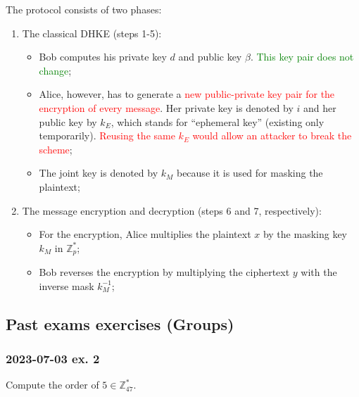 \documentclass[11pt, a4paper]{article}
\newcommand{\doublequotes}[1]{“#1”}
\begin{document}
\hfill\break The protocol consists of two phases:
\begin{enumerate}
    \item The classical DHKE (steps 1-5):
    \begin{itemize}
        \item Bob computes his private key $d$ and public key $\beta$. \textcolor{Green}{This key pair does not change};
        \item Alice, however, has to generate a \textcolor{red}{new public-private key pair for the encryption of every message}. Her private key is denoted by $i$ and her public key by $k_E$, which stands for \doublequotes{ephemeral key} (existing only temporarily). \textcolor{red}{Reusing the same $k_E$ would allow an attacker to break the scheme};
        \item The joint key is denoted by $k_M$ because it is used for masking the plaintext;
    \end{itemize}
    \item The message encryption and decryption (steps 6 and 7, respectively):
    \begin{itemize}
        \item For the encryption, Alice multiplies the plaintext $x$ by the masking key $k_M$ in $\mathbb{Z}_p^*$;
        \item Bob reverses the encryption by multiplying the ciphertext $y$ with the inverse mask $k_M^{-1}$;
    \end{itemize}
\end{enumerate}

\newpage
\subsection{Past exams exercises (Groups)}
\subsubsection{2023-07-03 ex. 2}
Compute the order of $5\in\mathbb{Z}_{47}^*$.
\end{document}
